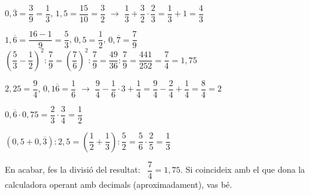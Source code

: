 \documentclass[11pt,a4paper]{article}
\begin{document}
\begin{exemple}
$0{,}\overline{3}=\dfrac39=\dfrac13$, \quad $1{,}5=\dfrac{15}{10}=\dfrac32$ \quad $\to$ \quad $\dfrac13+\dfrac32\cdot\dfrac23=\dfrac13+1=\boxed{\dfrac43}$
\end{exemple}

\begin{exemple}
$1{,}\overline{6}=\dfrac{16-1}{9}=\dfrac53$, \quad $0{,}5=\dfrac12$, \quad $0{,}\overline{7}=\dfrac79$\\[6pt]
$\left(\dfrac53-\dfrac12\right)^{2}:\dfrac79=\left(\dfrac76\right)^{2}:\dfrac79=\dfrac{49}{36}:\dfrac79=\dfrac{441}{252}=\boxed{\dfrac74}=1{,}75$
\end{exemple}

\begin{exemple}
$2{,}25=\dfrac94$, \quad $0{,}1\overline{6}=\dfrac16$ \quad $\to$ \quad $\dfrac94-\dfrac16\cdot3+\dfrac14=\dfrac94-\dfrac24+\dfrac14=\dfrac84=\boxed{2}$
\end{exemple}

\begin{exemple}
\begin{minipage}[t]{0.42\linewidth}
$0{,}\overline{6}\cdot0{,}75=\dfrac23\cdot\dfrac34=\boxed{\dfrac12}$
\end{minipage}\hfill
\begin{minipage}[t]{0.55\linewidth}
$\left(0{,}5+0{,}\overline{3}\right):2{,}5=\left(\dfrac12+\dfrac13\right):\dfrac52=\dfrac56\cdot\dfrac25=\boxed{\dfrac13}$
\end{minipage}
\end{exemple}

\begin{truc}
En acabar, fes la divisió del resultat: \ $\dfrac74=1{,}75$. Si coincideix amb el que dona la calculadora operant amb decimals (aproximadament), vas bé.
\end{truc}
\end{document}
